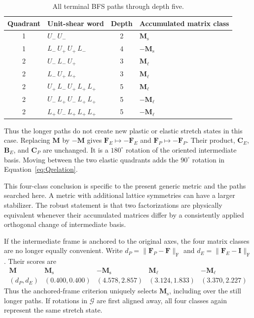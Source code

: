 \documentclass[11pt]{article}
\newcommand{\shortp}{\mathrm{s}}
\newcommand{\longp}{\ell}
\newcommand{\Frob}{\mathrm{F}}
\newcommand{\Uminus}{U_{-}}
\newcommand{\Lminus}{L_{-}}
\newcommand{\Lplus}{L_{+}}
\newcommand{\Uplus}{U_{+}}
\begin{document}
\begin{table}[htbp]
\centering
\caption{All terminal BFS paths through depth five.}
\label{tab:paths}
\small
\renewcommand{\arraystretch}{1.18}
\begin{tabularx}{0.88\textwidth}{@{}c l c X@{}}
\toprule
Quadrant & Unit-shear word & Depth & Accumulated matrix class \\
\midrule
1 & $\Uminus\,\Uminus$ & 2 & $\mathbf M_{\shortp}$ \\
1 & $\Lminus\,\Uplus\,\Uplus\,\Lminus$ & 4 & $-\mathbf M_{\shortp}$ \\
2 & $\Uminus\,\Lminus\,\Uplus$ & 3 & $\mathbf M_{\longp}$ \\
2 & $\Lminus\,\Uplus\,\Lplus$ & 3 & $\mathbf M_{\longp}$ \\
2 & $\Uplus\,\Lminus\,\Uplus\,\Lplus\,\Lplus$ & 5 & $\mathbf M_{\longp}$ \\
2 & $\Uminus\,\Lplus\,\Uminus\,\Lplus\,\Lplus$ & 5 & $-\mathbf M_{\longp}$ \\
2 & $\Lplus\,\Uminus\,\Lplus\,\Lplus\,\Lplus$ & 5 & $-\mathbf M_{\longp}$ \\
\bottomrule
\end{tabularx}
\end{table}

Thus the longer paths do not create new plastic or elastic stretch states in
this case.  Replacing \(\mathbf M\) by \(-\mathbf M\) gives
\(\mathbf F_E\mapsto-\mathbf F_E\) and
\(\mathbf F_P\mapsto-\mathbf F_P\).  Their product, \(\mathbf C_E\),
\(\mathbf B_E\), and \(\mathbf C_P\) are unchanged.  It is a $180^\circ$
rotation of the oriented intermediate basis.  Moving between the two elastic
quadrants adds the $90^\circ$ rotation in Equation~\eqref{eq:Qrelation}.

This four-class conclusion is specific to the present generic metric and the
paths searched here.  A metric with additional lattice symmetries can have a
larger stabilizer.  The robust statement is that two factorizations are
physically equivalent whenever their accumulated matrices differ by a
consistently applied orthogonal change of intermediate basis.

If the intermediate frame is anchored to the original axes, the four matrix
classes are no longer equally convenient.  Write
\(d_P=\lVert\mathbf F_P-\mathbf F\rVert_{\Frob}\) and
\(d_E=\lVert\mathbf F_E-\mathbf I\rVert_{\Frob}\).  Their scores are
\begin{equation}
 \begin{array}{c|cccc}
 \mathbf M & \mathbf M_{\shortp} & -\mathbf M_{\shortp}
 & \mathbf M_{\longp} & -\mathbf M_{\longp} \\ \hline
 (d_P,d_E) & (0.400,0.400) & (4.578,2.857)
 & (3.124,1.833) & (3.370,2.227)
 \end{array}
 \label{eq:fourclassscores}
\end{equation}
Thus the anchored-frame criterion uniquely selects
\(\mathbf M_{\shortp}\), including over the still longer paths.  If rotations
in \(\mathcal G\) are first aligned away, all four classes again represent the
same stretch state.
\end{document}
